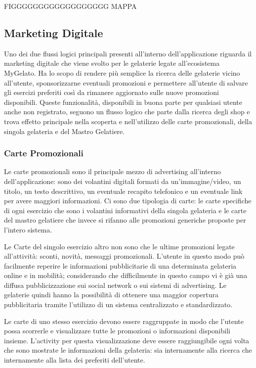 FIGGGGGGGGGGGGGGGGGG MAPPA


\subsection{Marketing Digitale}
Uno dei due flussi logici principali presenti all'interno dell'applicazione riguarda il marketing digitale che viene svolto per le gelaterie legate all'ecosistema MyGelato.
Ha lo scopo di rendere più semplice la ricerca delle gelaterie vicino all'utente, sponsorizzarne eventuali promozioni e permettere all'utente di salvare gli esercizi preferiti così da rimanere aggiornato sulle nuove promozioni disponibili.
Queste funzionalità, disponibili in buona parte per qualsiasi utente anche non registrato, seguono un flusso logico che parte dalla ricerca degli shop e trova effetto principale nella scoperta e nell'utilizzo delle carte promozionali, della singola gelateria e del Mastro Gelatiere.

\subsubsection{Carte Promozionali}
Le carte promozionali sono il principale mezzo di advertising all'interno dell'applicazione: sono dei volantini digitali formati da un'immagine/video, un titolo, un testo descrittivo, un eventuale recapito telefonico e un eventuale link per avere maggiori informazioni.
Ci sono due tipologia di carte: le carte specifiche di ogni esercizio che sono i volantini informativi della singola gelateria e le carte del mastro gelatiere che invece si rifanno alle promozioni generiche proposte per l'intero sistema.

Le Carte del singolo esercizio altro non sono che le ultime promozioni legate all'attività: sconti, novità, messaggi promozionali.
L'utente in questo modo può facilmente reperire le informazioni pubblicitarie di una determinata gelateria online e in mobilità; considerando che difficilmente in questo campo vi è già una diffusa pubblicizzazione sui social network o sui sistemi di advertising.
Le gelaterie quindi hanno la possibilità di ottenere una maggior copertura pubblicitaria tramite l'utilizzo di un sistema centralizzato e standardizzato.

Le carte di uno stesso esercizio devono essere raggruppate in modo che l'utente possa scorrerle e visualizzare tutte le promozioni o informazioni disponibili insieme.
L'activity per questa visualizzazione deve essere raggiungibile ogni volta che sono mostrate le informazioni della gelateria: sia internamente alla ricerca che internamente alla lista dei preferiti dell'utente.

